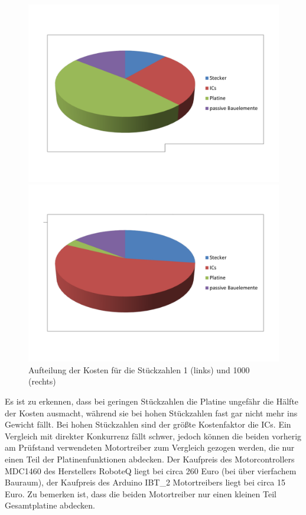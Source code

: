 \begin{figure}[h]
\begin{minipage}[h]{0.5\textwidth}
\includegraphics[width=\textwidth]{./Bilder/Platinenkosten.pdf}
\end{minipage}
\begin{minipage}[h]{0.5\textwidth}
\includegraphics[width=\textwidth]{./Bilder/Platinenkosten-tausend.pdf}
\end{minipage}
\caption{Aufteilung der Kosten für die Stückzahlen 1 (links) und 1000 (rechts)}
	\label{fig:LDO}
\end{figure}

Es ist zu erkennen, dass bei geringen Stückzahlen die Platine ungefähr die Hälfte der Kosten ausmacht, während sie bei hohen Stückzahlen fast gar nicht mehr ins Gewicht fällt. Bei hohen Stückzahlen sind der größte Kostenfaktor die ICs. 
Ein Vergleich mit direkter Konkurrenz fällt schwer, jedoch können die beiden vorherig am Prüfstand verwendeten Motortreiber zum Vergleich gezogen werden, die nur einen Teil der Platinenfunktionen abdecken. Der Kaufpreis des Motorcontrollers MDC1460 des Herstellers RoboteQ liegt bei circa 260 Euro (bei über vierfachem Bauraum), der Kaufpreis des Arduino IBT_2 Motortreibers liegt bei circa 15 Euro. Zu bemerken ist, dass die beiden Motortreiber nur einen kleinen Teil Gesamtplatine abdecken.

